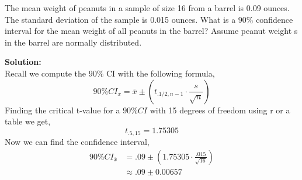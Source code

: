 \documentclass[12pt]{article}
\makeatletter
\theoremstyle{homework}
\newenvironment{exercise}[1]
{\def\@currentlabel{#1}\exercisecore}
{\endexercisecore}
\newcommand{\localhead}[1]{\par\smallskip\noindent\textbf{#1}\nobreak\\}%
\newcommand\solution{\localhead{Solution:}}
\makeatother
\begin{document}
\begin{exercise}{10} The mean weight of peanuts in a sample of size 16 from a barrel is 0.09 ounces. 
    The standard deviation of the sample is 0.015 ounces. What is a $90\%$ confidence interval for the mean weight of 
    all peanuts in the barrel? Assume peanut weight s in the barrel are normally distributed. 
    \solution 
Recall we compute the $90\%$ CI with the following formula, 
\begin{equation*}
    90\%CI_{\overline{x}} = \overline{x} \pm (t_{.1/2, n-1} \cdot \frac{s}{\sqrt{n}})
\end{equation*}
Finding the critical  t-value for a $90\%CI$ with 15 degrees of freedom using r or a table we get,  
\begin{equation*}
    t_{.5, 15} = 1.75305 
\end{equation*}
Now we can find the confidence interval, 
\begin{align*}
    90\%CI_{\overline{x}} &= .09 \pm ( 1.75305 \cdot \frac{.015}{\sqrt{16}})\\
    &\approx .09 \pm 0.00657
\end{align*}
\end{exercise}
\newpage
\end{document}
